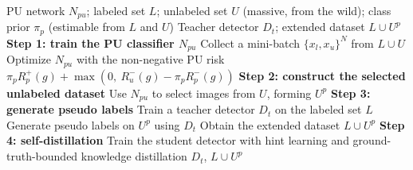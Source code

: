 \documentclass{article}
\begin{document}
\begin{algorithm}[!h]
\renewcommand{\algorithmicrequire}{\textbf{Input:}}
\renewcommand{\algorithmicensure}{\textbf{Output:}}
	\caption{PU data purification in the wild for object detection}
	\begin{algorithmic}[1]
	    \REQUIRE
	    PU network $N_{pu}$; labeled set $L$; unlabeled set $U$ (massive, from the wild);
	    class prior $\pi_{p}$ (estimable from $L$ and $U$)
	    \ENSURE
	    Teacher detector $D_{t}$; extended dataset $L\cup U^{p}$
	    \STATE \textbf{Step 1: train the PU classifier $N_{pu}$}
	    \STATE Collect a mini-batch $\{x_{l},x_{u}\}^{N}$ from $L\cup U$
	    \STATE Optimize $N_{pu}$ with the non-negative PU risk
	    $\pi_{p}R_{p}^{+}(g)+\max\!\left(0,\ R_{u}^{-}(g)-\pi_{p}R_{p}^{-}(g)\right)$ %
	    \ENDWHILE
	    \STATE \textbf{Step 2: construct the selected unlabeled dataset}
	    \STATE Use $N_{pu}$ to select images from $U$, forming $U^{p}$ %
	    \STATE \textbf{Step 3: generate pseudo labels}
	    \STATE Train a teacher detector $D_{t}$ on the labeled set $L$
	    \STATE Generate pseudo labels on $U^{p}$ using $D_{t}$ %
	    \STATE Obtain the extended dataset $L\cup U^{p}$
	    \STATE \textbf{Step 4: self-distillation}
	    \STATE Train the student detector with hint learning and
	    ground-truth-bounded knowledge distillation %
		\RETURN $D_{t}$, $L\cup U^{p}$
	\end{algorithmic}
\end{algorithm}
\end{document}
